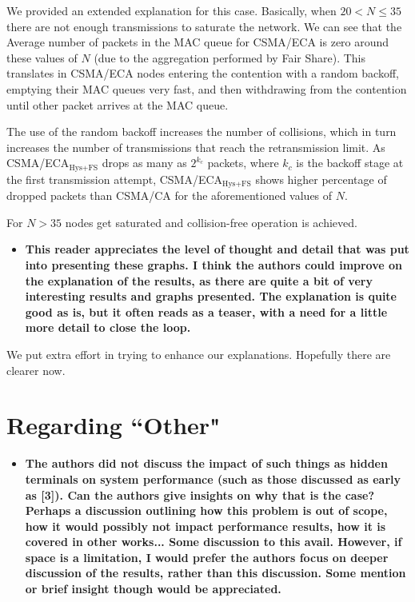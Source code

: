 \documentclass[]{article}
\begin{document}
		We provided an extended explanation for this case. Basically, when $20 < N \leq 35$ there are not enough transmissions to saturate the network. We can see that the Average number of packets in the MAC queue for CSMA/ECA is zero around these values of $N$ (due to the aggregation performed by Fair Share). This translates in CSMA/ECA nodes entering the contention with a random backoff, emptying their MAC queues very fast, and then withdrawing from the contention until other packet arrives at the MAC queue. 
		
		The use of the random backoff increases the number of collisions, which in turn increases the number of transmissions that reach the retransmission limit. As CSMA/ECA$_{\text{Hys+FS}}$ drops as many as $2^{k_{c}}$ packets, where $k_{c}$ is the backoff stage at the first transmission attempt, CSMA/ECA$_{\text{Hys+FS}}$ shows higher percentage of dropped packets than CSMA/CA for the aforementioned values of $N$.
		
		For $N>35$ nodes get saturated and collision-free operation is achieved.
		
		\begin{itemize}
			\item {\bfseries This reader appreciates the level of thought and detail that was put into presenting these graphs. I think the authors could improve on the explanation of the results, as there are quite a bit of very interesting results and graphs presented. The explanation is quite good as is, but it often reads as a teaser, with a need for a little more detail to close the loop.}
		\end{itemize}
		
		We put extra effort in trying to enhance our explanations. Hopefully there are clearer now.
		
	\section{Regarding ``Other"}
		\begin{itemize}
			\item {\bf The authors did not discuss the impact of such things as hidden terminals on system performance (such as those discussed as early as [3]). Can the authors give insights on why that is the case? Perhaps a discussion outlining how this problem is out of scope, how it would possibly not impact performance results, how it is covered in other works... Some discussion to this avail. However, if space is a limitation, I would prefer the authors focus on deeper discussion of the results, rather than this discussion. Some mention or brief insight though would be appreciated.}
		\end{itemize}
\end{document}
